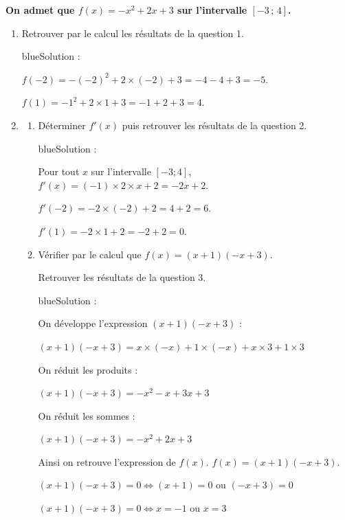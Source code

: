 \documentclass[10pt]{article}
\begin{document}
\textbf{On admet que $f(x)=-x^2+2x+3$ sur l'intervalle $[-3\,;\,4]$.}
\begin{enumerate}[start=5]
\item Retrouver par le calcul les résultats de la question 1.

\begin{color}{blue}Solution :\par
$f(-2)=-(-2)^2+2\times(-2)+3 = -4 - 4 + 3 = -5$.

$f(1)=-1^2+2\times 1 +3 = -1  + 2 + 3 = 4$.
\end{color}

\item
\begin{enumerate}[label=\alph*)]
\item Déterminer $f'(x)$ puis retrouver les résultats de la question 2.

\begin{color}{blue}Solution :\par
Pour tout $x$ sur l'intervalle $[-3;4]$, $f'(x) = (-1) \times 2\times x + 2 = -2x+2 $.

$f'(-2)=-2\times (-2) + 2  = 4 + 2 = 6$.

$f'(1)=-2\times 1 + 2  = -2 + 2 = 0$.



\end{color}

\item Vérifier par le calcul que $f(x)=(x+1)(-x+3)$.\par Retrouver les résultats de la question 3.

\begin{color}{blue}Solution :\par
On développe l'expression $(x+1)(-x+3)$ :

$(x+1)(-x+3) = x\times(-x) + 1\times (-x) +x\times 3 + 1\times 3$

On réduit les produits :

$(x+1)(-x+3) = -x^2 - x + 3x + 3$

On réduit les sommes :

$(x+1)(-x+3) = -x^2 + 2x + 3$

Ainsi on retrouve l'expression de $f(x)$. $f(x)=(x+1)(-x+3)$.

$(x+1)(-x+3) = 0 \iff (x+1) = 0 \text{ ou } (-x+3) = 0 $

$(x+1)(-x+3) = 0 \iff x = -1 \text{ ou } x = 3 $
\end{color}




\end{enumerate}
\end{enumerate}
\end{document}
